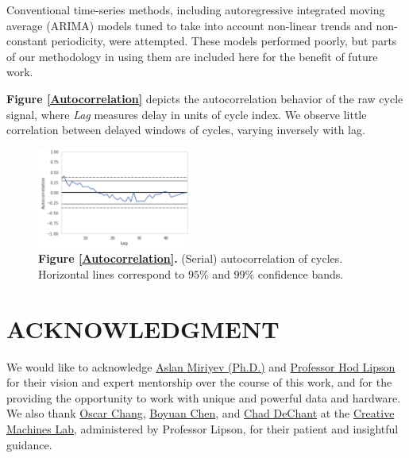 \documentclass[letterpaper, 10 pt, conference]{ieeeconf}  %
\begin{document}
Conventional time-series methods, including autoregressive integrated moving average (ARIMA) models tuned to take into account non-linear trends and non-constant periodicity, were attempted. These models performed poorly, but parts of our methodology in using them are included here for the benefit of future work.

\textbf{Figure \ref{Autocorrelation}} depicts the autocorrelation behavior of the raw cycle signal, where \textit{Lag} measures delay in units of cycle index. We observe little correlation between delayed windows of cycles, varying inversely with lag.

\label{Autocorrelation}
\begin{figure}[h]
	\centering
	\includegraphics[width=0.45\textwidth]{assets/autocorrelation.png}
  \caption*{\textbf{Figure \ref{Autocorrelation}.} (Serial) autocorrelation of cycles. Horizontal lines correspond to $95\%$ and $99\%$ confidence bands.}
\end{figure}



\section*{ACKNOWLEDGMENT}

We would like to acknowledge \href{http://aslanmiriyev.com/}{Aslan Miriyev (Ph.D.)} and \href{https://www.hodlipson.com/}{Professor Hod Lipson} for their vision and expert mentorship over the course of this work, and for the providing the opportunity to work with unique and powerful data and hardware. We also thank \href{http://ogchang.com/}{Oscar Chang}, \href{http://www.cs.columbia.edu/~bchen/}{Boyuan Chen}, and \href{http://www.cs.columbia.edu/~dechant/}{Chad DeChant} at the \href{https://www.creativemachineslab.com/}{Creative Machines Lab}, administered by Professor Lipson, for their patient and insightful guidance.
\end{document}
